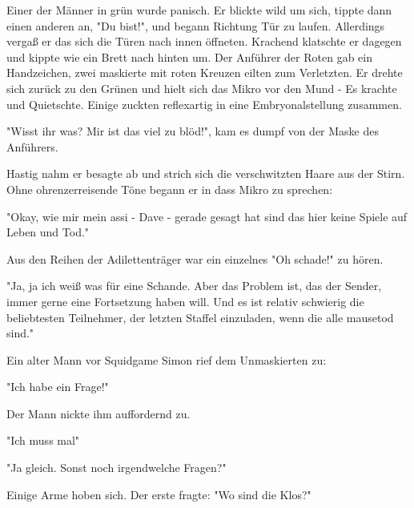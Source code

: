 \documentclass[ebook]{article}
\begin{document}
\noindent Einer der Männer in grün wurde panisch. Er blickte wild um
sich, tippte dann einen anderen an, "Du bist!", und begann Richtung
Tür zu laufen. Allerdings vergaß er das sich die Türen nach innen
öffneten. Krachend klatschte er dagegen und kippte wie ein Brett
nach hinten um. Der Anführer der Roten gab ein Handzeichen, zwei
maskierte mit roten Kreuzen eilten zum Verletzten. Er drehte sich
zurück zu den Grünen und hielt sich das Mikro vor den Mund - Es
krachte und Quietschte. Einige zuckten reflexartig in eine
Embryonalstellung zusammen.

\begin{center}
"Wisst ihr was? Mir ist das viel zu blöd!", kam es dumpf von der
Maske des Anführers.
\end{center}

\noindent Hastig nahm er besagte ab und strich sich die
verschwitzten Haare aus der Stirn. Ohne ohrenzerreisende Töne begann
er in dass Mikro zu sprechen:

\begin{center}
"Okay, wie mir mein assi - Dave - gerade gesagt hat sind das hier
keine Spiele auf Leben und Tod."
\end{center}

\noindent Aus den Reihen der Adilettenträger war ein einzelnes "Oh
schade!" zu hören.

\begin{center}
"Ja, ja ich weiß was für eine Schande. Aber das Problem ist, das der
Sender, immer gerne eine Fortsetzung haben will. Und es ist relativ
schwierig die beliebtesten Teilnehmer, der letzten Staffel
einzuladen, wenn die alle mausetod sind."
\end{center}

\noindent Ein alter Mann vor Squidgame Simon rief dem Unmaskierten
zu:

\begin{center}
"Ich habe ein Frage!"
\end{center}

\noindent Der Mann nickte ihm auffordernd zu.

\begin{center}
"Ich muss mal"
\end{center}

\begin{center}
"Ja gleich. Sonst noch irgendwelche Fragen?"
\end{center}

\noindent Einige Arme hoben sich. Der erste fragte: "Wo sind die
Klos?"
\end{document}

